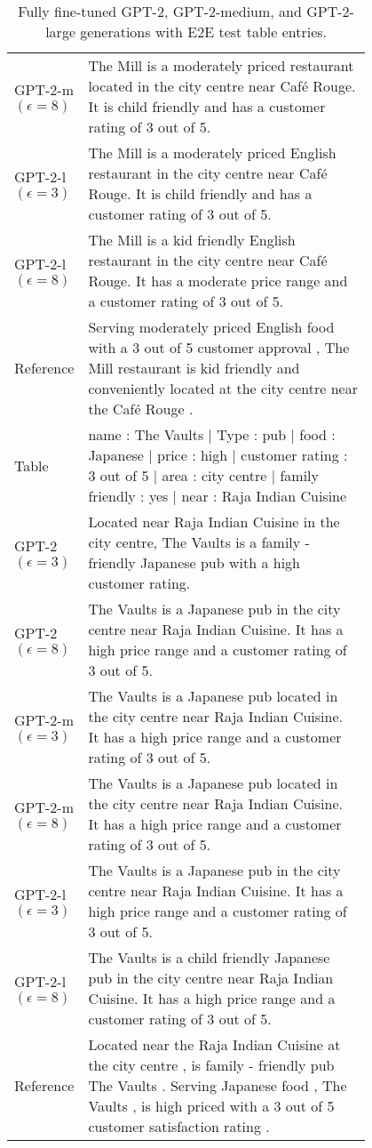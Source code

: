 \begin{table}[h]
\begin{tabular}{l | p{0.8\linewidth}}
GPT-2-m $(\epsilon=8)$ & The Mill is a moderately priced restaurant located in the city centre near Café Rouge. It is child friendly and has a customer rating of 3 out of 5. \\
GPT-2-l $(\epsilon=3)$ & The Mill is a moderately priced English restaurant in the city centre near Café Rouge. It is child friendly and has a customer rating of 3 out of 5. \\
GPT-2-l $(\epsilon=8)$ & The Mill is a kid friendly English restaurant in the city centre near Café Rouge. It has a moderate price range and a customer rating of 3 out of 5. \\
\hline
 Reference & Serving moderately priced English food with a 3 out of 5 customer approval , The Mill restaurant is kid friendly and conveniently located at the city centre near the Café Rouge . \\
\midrule\midrule
Table & name : The Vaults | Type : pub | food : Japanese | price : high | customer rating : 3 out of 5 | area : city centre | family friendly : yes | near : Raja Indian Cuisine  \\
 \hline
GPT-2 $(\epsilon=3)$ & Located near Raja Indian Cuisine in the city centre, The Vaults is a family - friendly Japanese pub with a high customer rating. \\
GPT-2 $(\epsilon=8)$ & The Vaults is a Japanese pub in the city centre near Raja Indian Cuisine. It has a high price range and a customer rating of 3 out of 5. \\
GPT-2-m $(\epsilon=3)$ & The Vaults is a Japanese pub located in the city centre near Raja Indian Cuisine. It has a high price range and a customer rating of 3 out of 5. \\
GPT-2-m $(\epsilon=8)$ & The Vaults is a Japanese pub located in the city centre near Raja Indian Cuisine. It has a high price range and a customer rating of 3 out of 5. \\
GPT-2-l $(\epsilon=3)$ & The Vaults is a Japanese pub in the city centre near Raja Indian Cuisine. It has a high price range and a customer rating of 3 out of 5. \\
GPT-2-l $(\epsilon=8)$ & The Vaults is a child friendly Japanese pub in the city centre near Raja Indian Cuisine. It has a high price range and a customer rating of 3 out of 5. \\
\hline
 Reference & Located near the Raja Indian Cuisine at the city centre , is family - friendly pub The Vaults . Serving Japanese food , The Vaults , is high priced with a 3 out of 5 customer satisfaction rating . \\
\bottomrule
\end{tabular}
\caption{Fully fine-tuned GPT-2, GPT-2-medium, and GPT-2-large generations with E2E test table entries.}
\end{table}


